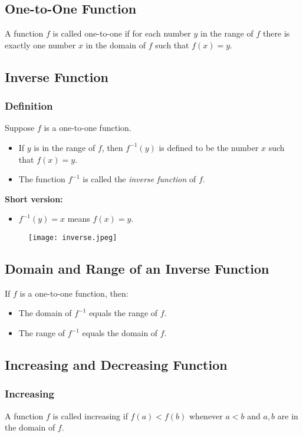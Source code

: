 \subsection{One-to-One Function}
A function \(f\) is called one-to-one if for each number \(y\) in the range of \(f\) there is
exactly one number \(x\) in the domain of \(f\) such that \(f (x) = y\).

\subsection{Inverse Function}
\subsubsection{Definition}
Suppose \( f \) is a one-to-one function.
\begin{itemize}
  \item If \( y \) is in the range of \( f \), then \( f^{-1}(y) \) is defined to be the number \( x \) such that \( f(x) = y \).
  \item The function \( f^{-1} \) is called the \emph{inverse function} of \( f \).
\end{itemize}
\textbf{Short version:}
\begin{itemize}
  \item \( f^{-1}(y) = x \) means \( f(x) = y \).
\end{itemize}

\begin{figure}
  \centering
  \texttt{[image: inverse.jpeg]}
\end{figure}

\subsection{Domain and Range of an Inverse Function}
If \( f \) is a one-to-one function, then:
\begin{itemize}
  \item The domain of \( f^{-1} \) equals the range of \( f \).
  \item The range of \( f^{-1} \) equals the domain of \( f \).
\end{itemize}

\subsection{Increasing and Decreasing Function}
\subsubsection{Increasing}
A function \(f\) is called increasing if \(f (a) < f (b)\) whenever \(a < b\) and \(a, b \) are in
the domain of \(f\).

